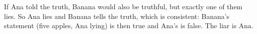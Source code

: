 If Ana told the truth, Banana would also be truthful, but exactly one of them lies. So Ana lies and Banana tells the truth, which is consistent: Banana's statement (five apples, Ana lying) is then true and Ana's is false. The liar is $\boxed{\text{Ana}}$.
